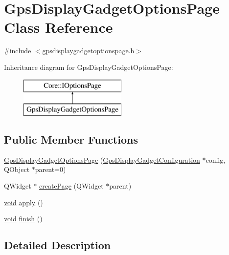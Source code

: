 \hypertarget{class_gps_display_gadget_options_page}{\section{\-Gps\-Display\-Gadget\-Options\-Page \-Class \-Reference}
\label{class_gps_display_gadget_options_page}
}


{\ttfamily \#include $<$gpsdisplaygadgetoptionspage.\-h$>$}

\-Inheritance diagram for \-Gps\-Display\-Gadget\-Options\-Page\-:\begin{figure}[H]
\begin{center}
\leavevmode
\includegraphics[height=2.000000cm]{class_gps_display_gadget_options_page}
\end{center}
\end{figure}
\subsection*{\-Public \-Member \-Functions}
\begin{DoxyCompactItemize}
\item 
\hyperlink{group___g_p_s_gadget_plugin_ga2cc5111e9489419740cbbfb61043fcd3}{\-Gps\-Display\-Gadget\-Options\-Page} (\hyperlink{class_gps_display_gadget_configuration}{\-Gps\-Display\-Gadget\-Configuration} $\ast$config, \-Q\-Object $\ast$parent=0)
\item 
\-Q\-Widget $\ast$ \hyperlink{group___g_p_s_gadget_plugin_gac8c534a784eaab5341c1baf07c5dec0b}{create\-Page} (\-Q\-Widget $\ast$parent)
\item 
\hyperlink{group___u_a_v_objects_plugin_ga444cf2ff3f0ecbe028adce838d373f5c}{void} \hyperlink{group___g_p_s_gadget_plugin_gae80bdcce5ad91f0ada2fcf74ee83242a}{apply} ()
\item 
\hyperlink{group___u_a_v_objects_plugin_ga444cf2ff3f0ecbe028adce838d373f5c}{void} \hyperlink{group___g_p_s_gadget_plugin_gaa513cdfb1866a8dec9976710811b48cb}{finish} ()
\end{DoxyCompactItemize}


\subsection{\-Detailed \-Description}


